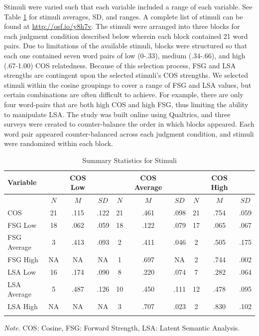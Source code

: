 \documentclass[english,man]{apa6}
\theoremstyle{definition}
\theoremstyle{definition}
\theoremstyle{remark}
\begin{document}
Stimuli were varied such that each variable included a range of each
variable. See Table \ref{tab:stim-table} for stimuli averages, SD, and
ranges. A complete list of stimuli can be found at
\url{http://osf.io/y8h7v}. The stimuli were arranged into three blocks
for each judgment condition described below wherein each block contained
21 word pairs. Due to limitations of the available stimuli, blocks were
structured so that each one contained seven word pairs of low (0-.33),
medium (.34-.66), and high (.67-1.00) COS relatedness. Because of this
selection process, FSG and LSA strengths are contingent upon the
selected stimuli's COS strengths. We selected stimuli within the cosine
groupings to cover a range of FSG and LSA values, but certain
combinations are often difficult to achieve. For example, there are only
four word-pairs that are both high COS and high FSG, thus limiting the
ability to manipulate LSA. The study was built online using Qualtrics,
and three surveys were created to counter-balance the order in which
blocks appeared. Each word pair appeared counter-balanced across each
judgment condition, and stimuli were randomized within each block.

\begin{table}[tbp]
\begin{center}
\begin{threeparttable}
\caption{\label{tab:stim-table}Summary Statistics for Stimuli}
\begin{tabular}{lccccccccc}
\toprule
Variable & \multicolumn{1}{c}{ } & \multicolumn{1}{c}{COS Low} & \multicolumn{1}{c}{ } & \multicolumn{1}{c}{ } & \multicolumn{1}{c}{COS Average} & \multicolumn{1}{c}{ } & \multicolumn{1}{c}{ } & \multicolumn{1}{c}{COS High} & \multicolumn{1}{c}{ }\\
\midrule
 & $N$ & $M$ & $SD$ & $N$ & $M$ & $SD$ & $N$ & $M$ & $SD$\\
COS & 21 & .115 & .122 & 21 & .461 & .098 & 21 & .754 & .059\\
FSG Low & 18 & .062 & .059 & 18 & .122 & .079 & 17 & .065 & .067\\
FSG Average & 3 & .413 & .093 & 2 & .411 & .046 & 2 & .505 & .175\\
FSG High & NA & NA & NA & 1 & .697 & NA & 2 & .744 & .002\\
LSA Low & 16 & .174 & .090 & 8 & .220 & .074 & 7 & .282 & .064\\
LSA Average & 5 & .487 & .126 & 10 & .450 & .111 & 12 & .478 & .095\\
LSA High & NA & NA & NA & 3 & .707 & .023 & 2 & .830 & .102\\
\bottomrule
\addlinespace
\end{tabular}
\begin{tablenotes}[para]
\textit{Note.} COS: Cosine, FSG: Forward Strength, LSA: Latent Semantic Analysis.
\end{tablenotes}
\end{threeparttable}
\end{center}
\end{table}
\end{document}
